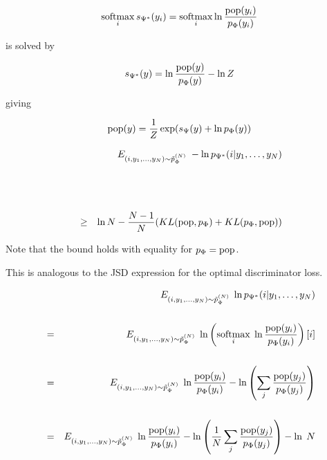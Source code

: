 {

$$\operatorname*{softmax}_i s_{\Psi^*}(y_i) =  \operatorname*{softmax}_i \ln \frac{\mathrm{pop}(y_i)}{p_\Phi(y_i)}$$

\vfill
is solved by

\vfill
$$s_{\Psi^*}(y) = \ln \frac{\mathrm{pop}(y)}{p_\Phi(y)} - \ln Z$$

\vfill
giving

$$\mathrm{pop}(y) = \frac{1}{Z} \exp(s_\Psi(y) + \ln p_\Phi(y))$$


\begin{eqnarray*}
  && E_{(i,y_1,\dots,y_{N}) \sim \tilde{p}_\Phi^{(N)}}\;- \ln p_{\Psi^*}(i|y_1,\ldots,y_{N}) \\
  \\
  \\
  \\
  & \geq & \ln N - \frac{N-1}{N}(KL(\mathrm{pop},p_\Phi) + KL(p_\Phi,\mathrm{pop}))
\end{eqnarray*}

\vfill
Note that the bound holds with equality for $p_\Phi = \mathrm{pop}$.

\vfill
This is analogous to the JSD expression for the optimal discriminator loss.

{\huge
 \begin{eqnarray*}
    & & E_{(i,y_1,\ldots,y_{N}) \sim \tilde{p}_\Phi^{(N)}}\;\ln p_{\Psi^*}(i|y_1,\ldots,y_{N}) \\
    \\
    & = & E_{(i,y_1,\ldots,y_{N}) \sim \tilde{p}_\Phi^{(N)}}\;\ln \left(\operatorname*{softmax}_i \;\ln \frac{\mathrm{pop}(y_i)}{p_\Phi(y_i)}\right)[i] \\
    \\
    & = & E_{(i,y_1,\ldots,y_{N}) \sim \tilde{p}_\Phi^{(N)}}\;\ln\frac{\mathrm{pop}(y_i)}{p_\Phi(y_i)} - \ln\left(\sum_j \frac{\mathrm{pop}(y_j)}{p_\Phi(y_j)} \right) \\
    \\
    & = & E_{(i,y_1,\ldots,y_{N}) \sim \tilde{p}_\Phi^{(N)}}\;\ln\frac{\mathrm{pop}(y_i)}{p_\Phi(y_i)} - \ln\left(\frac{1}{N}\sum_j \frac{\mathrm{pop}(y_j)}{p_\Phi(y_j)} \right) - \ln\;N
  \end{eqnarray*}
}

}
